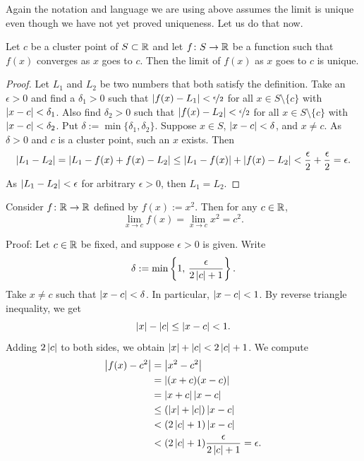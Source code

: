 Again the notation and language we are using above assumes the limit
is unique even though we have not yet proved uniqueness.
Let us do that now.

\begin{prop}
Let $c$ be a cluster point of $S \subset {\mathbb{R}}$ and let $f \colon S \to {\mathbb{R}}$
be a function such that $f(x)$ converges as $x$ goes to $c$.  Then
the limit of $f(x)$ as $x$ goes to $c$ is unique.
\end{prop}

\begin{proof}
Let $L_1$ and $L_2$ be two numbers that both satisfy the definition.
Take an $\epsilon > 0$ and find a $\delta_1 > 0$ such that
$\left\lvert {f(x)-L_1} \right\rvert < \nicefrac{\epsilon}{2}$ 
for all $x \in S \setminus \{c\}$ with $\left\lvert {x-c} \right\rvert < \delta_1$.
Also find $\delta_2 > 0$ such that
$\left\lvert {f(x)-L_2} \right\rvert < \nicefrac{\epsilon}{2}$
for all $x \in S \setminus \{c\}$ with $\left\lvert {x-c} \right\rvert < \delta_2$.
Put $\delta := \min \{ \delta_1, \delta_2 \}$.  Suppose $x \in S$,
$\left\lvert {x-c} \right\rvert < \delta$, and $x \not= c$.  As $\delta > 0$ and $c$ is a cluster
point, such an $x$ exists.  Then
\begin{equation*}
\left\lvert {L_1 - L_2} \right\rvert =
\left\lvert {L_1 - f(x) + f(x) - L_2} \right\rvert \leq
\left\lvert {L_1 - f(x)} \right\rvert + \left\lvert {f(x) - L_2} \right\rvert < \frac{\epsilon}{2} + \frac{\epsilon}{2}
= \epsilon.
\end{equation*}
As $\left\lvert {L_1-L_2} \right\rvert < \epsilon$ for arbitrary $\epsilon > 0$, then
$L_1 = L_2$.
\end{proof}

\begin{example}
Consider $f \colon {\mathbb{R}} \to {\mathbb{R}}$ defined by $f(x) := x^2$.  Then
for any $c \in {\mathbb{R}}$,
\begin{equation*}
\lim_{x\to c} f(x) = \lim_{x\to c} x^2 = c^2 .
\end{equation*}

Proof: Let $c \in {\mathbb{R}}$ be fixed, and suppose $\epsilon > 0$ is given.  Write
\begin{equation*}
\delta := \min \left\{ 1 , \, \frac{\epsilon}{2\left\lvert {c} \right\rvert+1} \right\} .
\end{equation*}
Take $x \not= c$ such that $\left\lvert {x-c} \right\rvert < \delta$.  In particular,
$\left\lvert {x-c} \right\rvert < 1$.  By reverse triangle inequality, we get
\begin{equation*}
\left\lvert {x} \right\rvert-\left\lvert {c} \right\rvert \leq \left\lvert {x-c} \right\rvert < 1 .
\end{equation*}
Adding $2\left\lvert {c} \right\rvert$ to both sides, we obtain
$\left\lvert {x} \right\rvert + \left\lvert {c} \right\rvert < 2\left\lvert {c} \right\rvert + 1$.  We compute
\begin{equation*}
\begin{split}
\left\lvert {f(x) - c^2} \right\rvert &= \left\lvert {x^2-c^2} \right\rvert \\
&= \left\lvert {(x+c)(x-c)} \right\rvert \\
&= \left\lvert {x+c} \right\rvert\left\lvert {x-c} \right\rvert \\
&\leq (\left\lvert {x} \right\rvert+\left\lvert {c} \right\rvert)\left\lvert {x-c} \right\rvert \\
&< (2\left\lvert {c} \right\rvert+1)\left\lvert {x-c} \right\rvert \\
&< (2\left\lvert {c} \right\rvert+1)\frac{\epsilon}{2\left\lvert {c} \right\rvert+1} = \epsilon .
\end{split}
\end{equation*}
\end{example}

